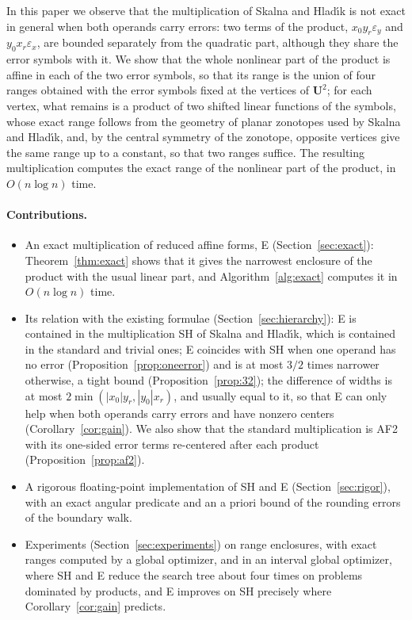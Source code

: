 \documentclass[10pt]{article}
\theoremstyle{definition}
\newcommand{\U}{\mathbf{U}}
\newcommand{\eps}{\varepsilon}
\newcommand{\ex}{\eps_x}
\newcommand{\ey}{\eps_y}
\begin{document}
In this paper we observe that the multiplication of Skalna and Hlad\'{\i}k is not exact in general when both operands carry errors: two terms of the product, $x_0 y_r\ey$ and $y_0 x_r\ex$, are bounded separately from the quadratic part, although they share the error symbols with it. We show that the whole nonlinear part of the product is affine in each of the two error symbols, so that its range is the union of four ranges obtained with the error symbols fixed at the vertices of $\U^2$; for each vertex, what remains is a product of two shifted linear functions of the symbols, whose exact range follows from the geometry of planar zonotopes used by Skalna and Hlad\'{\i}k, and, by the central symmetry of the zonotope, opposite vertices give the same range up to a constant, so that two ranges suffice. The resulting multiplication computes the exact range of the nonlinear part of the product, in $O(n\log n)$ time.

\paragraph{Contributions.}
\begin{itemize}
\item An exact multiplication of reduced affine forms, E (Section~\ref{sec:exact}): Theorem~\ref{thm:exact} shows that it gives the narrowest enclosure of the product with the usual linear part, and Algorithm~\ref{alg:exact} computes it in $O(n\log n)$ time.
\item Its relation with the existing formulae (Section~\ref{sec:hierarchy}): E is contained in the multiplication SH of Skalna and Hlad\'{\i}k, which is contained in the standard and trivial ones; E coincides with SH when one operand has no error (Proposition~\ref{prop:oneerror}) and is at most $3/2$ times narrower otherwise, a tight bound (Proposition~\ref{prop:32}); the difference of widths is at most $2\min(|x_0|y_r,|y_0|x_r)$, and usually equal to it, so that E can only help when both operands carry errors and have nonzero centers (Corollary~\ref{cor:gain}). We also show that the standard multiplication is AF2~\cite{messine2002extentions} with its one-sided error terms re-centered after each product (Proposition~\ref{prop:af2}).
\item A rigorous floating-point implementation of SH and E (Section~\ref{sec:rigor}), with an exact angular predicate and an a priori bound of the rounding errors of the boundary walk.
\item Experiments (Section~\ref{sec:experiments}) on range enclosures, with exact ranges computed by a global optimizer, and in an interval global optimizer, where SH and E reduce the search tree about four times on problems dominated by products, and E improves on SH precisely where Corollary~\ref{cor:gain} predicts.
\end{itemize}
\end{document}
